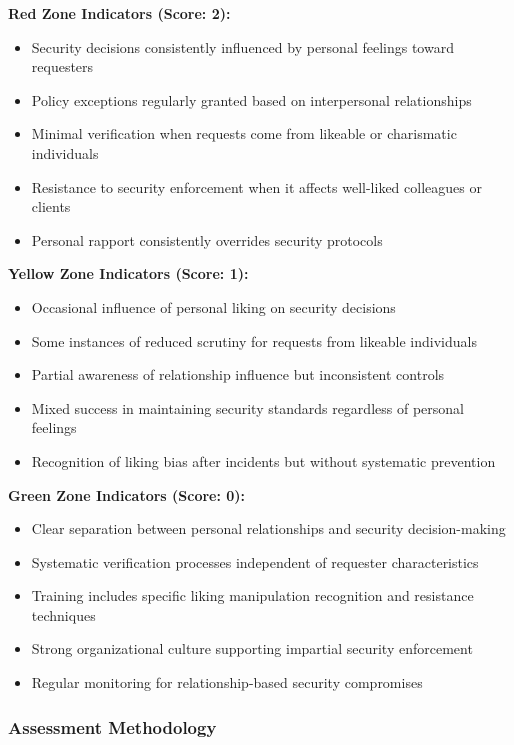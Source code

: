 \documentclass[11pt,a4paper]{article}
\begin{document}
\textbf{Red Zone Indicators (Score: 2):}
\begin{itemize}
\item Security decisions consistently influenced by personal feelings toward requesters
\item Policy exceptions regularly granted based on interpersonal relationships
\item Minimal verification when requests come from likeable or charismatic individuals
\item Resistance to security enforcement when it affects well-liked colleagues or clients
\item Personal rapport consistently overrides security protocols
\end{itemize}

\textbf{Yellow Zone Indicators (Score: 1):}
\begin{itemize}
\item Occasional influence of personal liking on security decisions
\item Some instances of reduced scrutiny for requests from likeable individuals
\item Partial awareness of relationship influence but inconsistent controls
\item Mixed success in maintaining security standards regardless of personal feelings
\item Recognition of liking bias after incidents but without systematic prevention
\end{itemize}

\textbf{Green Zone Indicators (Score: 0):}
\begin{itemize}
\item Clear separation between personal relationships and security decision-making
\item Systematic verification processes independent of requester characteristics
\item Training includes specific liking manipulation recognition and resistance techniques
\item Strong organizational culture supporting impartial security enforcement
\item Regular monitoring for relationship-based security compromises
\end{itemize}

\subsubsection{Assessment Methodology}
\end{document}
